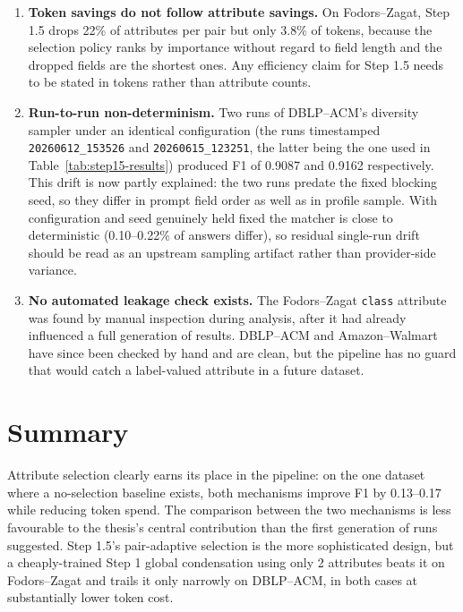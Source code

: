 \documentclass[11pt]{article}
\begin{document}
\begin{enumerate}
13-attribute schema, not evidence about the selector's quality, and it means the
Amazon--Walmart run does not currently test adaptive selection in any meaningful
sense.
\item \textbf{Token savings do not follow attribute savings.} On Fodors--Zagat,
Step 1.5 drops 22\% of attributes per pair but only 3.8\% of tokens, because the
selection policy ranks by importance without regard to field length and the
dropped fields are the shortest ones. Any efficiency claim for Step 1.5 needs to be
stated in tokens rather than attribute counts.
\item \textbf{Run-to-run non-determinism.} Two runs of DBLP--ACM's diversity
sampler under an identical configuration (the runs timestamped
\texttt{20260612\_153526} and \texttt{20260615\_123251}, the latter being the one
used in Table~\ref{tab:step15-results}) produced F1 of 0.9087 and 0.9162
respectively. This drift is now partly explained: the two runs predate the fixed
blocking seed, so they differ in prompt field order as well as in profile sample.
With configuration and seed genuinely held fixed the matcher is close to
deterministic (0.10--0.22\% of answers differ), so residual single-run drift should
be read as an upstream sampling artifact rather than provider-side variance.
\item \textbf{No automated leakage check exists.} The Fodors--Zagat \texttt{class}
attribute was found by manual inspection during analysis, after it had already
influenced a full generation of results. DBLP--ACM and Amazon--Walmart have since
been checked by hand and are clean, but the pipeline has no guard that would catch
a label-valued attribute in a future dataset.
\end{enumerate}

\section{Summary}

Attribute selection clearly earns its place in the pipeline: on the one dataset
where a no-selection baseline exists, both mechanisms improve F1 by 0.13--0.17
while reducing token spend. The comparison between the two mechanisms is less
favourable to the thesis's central contribution than the first generation of runs
suggested. Step 1.5's pair-adaptive selection is the more sophisticated design, but
a cheaply-trained Step 1 global condensation using only 2 attributes beats it on
Fodors--Zagat and trails it only narrowly on DBLP--ACM, in both cases at
substantially lower token cost.
\end{document}
